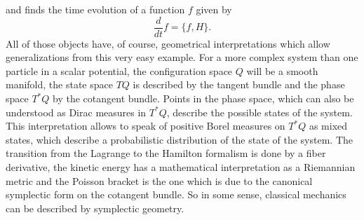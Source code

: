 and finds the time evolution of a function $f$ given by
\begin{equation*}
	\frac{d}{dt} f
	=
	\{ f, H \}.
\end{equation*}
All of those objects have, of course, geometrical interpretations which 
allow generalizations from this very easy example. For a more 
complex system than one particle in a scalar potential, the configuration space 
$Q$ will be a smooth manifold, the state space $TQ$ is described by the tangent 
bundle and the phase space $T^*Q$ by the cotangent bundle. Points in the phase 
space, which can also be understood as Dirac measures in $T^*Q$, describe the 
possible states of the system. This interpretation allows to speak of positive 
Borel measures on $T^*Q$ as mixed states, which describe a probabilistic 
distribution of the state of the system. The transition from 
the Lagrange to the Hamilton formalism is done by a fiber derivative, the 
kinetic energy has a mathematical interpretation as a Riemannian metric and the 
Poisson bracket is the one which is due to the canonical symplectic form on the 
cotangent bundle. So in some sense, classical mechanics can be described by 
symplectic geometry.


